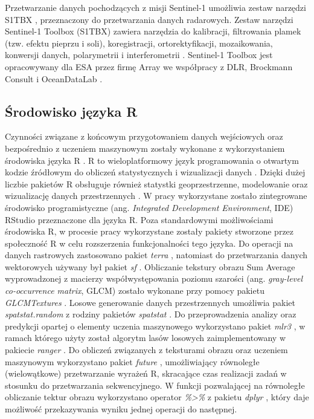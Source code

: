 \documentclass{amuthesis}
\begin{document}
Przetwarzanie danych pochodzących z misji Sentinel-1 umożliwia zestaw
narzędzi S1TBX \autocite{s1tbx}, przeznaczony do przetwarzania danych
radarowych. Zestaw narzędzi Sentinel-1 Toolbox (S1TBX) zawiera narzędzia
do kalibracji, filtrowania plamek (tzw. efektu pieprzu i soli),
koregistracji, ortorektyfikacji, mozaikowania, konwersji danych,
polarymetrii i interferometrii \autocite{sentinel-1-toolbox}. Sentinel-1
Toolbox jest opracowywany dla ESA przez firmę Array we współpracy z DLR,
Brockmann Consult i OceanDataLab \autocite{sentinel-1-toolbox}.

\hypertarget{ux15brodowisko-jux119zyka-r}{%
\subsection{Środowisko języka R}\label{ux15brodowisko-jux119zyka-r}}

Czynności związane z końcowym przygotowaniem danych wejściowych oraz
bezpośrednio z uczeniem maszynowym zostały wykonane z wykorzystaniem
środowiska języka R \autocite{R-base}. R to wieloplatformowy język
programowania o otwartym kodzie źródłowym do obliczeń statystycznych i
wizualizacji danych \autocite{lovelace_2019_geocomputation}. Dzięki
dużej liczbie pakietów R obsługuje również statystki geoprzestrzenne,
modelowanie oraz wizualizację danych przestrzennych
\autocite{lovelace_2019_geocomputation}. W pracy wykorzystane zostało
zintegrowane środowisko programistyczne (ang. \emph{Integrated
Development Environment}, IDE) RStudio
\autocite{rstudio_team_2020_rstudio} przeznaczone dla języka R. Poza
standardowymi możliwościami środowiska R, w procesie pracy wykorzystane
zostały pakiety stworzone przez społeczność R w celu rozszerzenia
funkcjonalności tego języka. Do operacji na danych rastrowych
zastosowano pakiet \emph{terra} \autocite{R-terra}, natomiast do
przetwarzania danych wektorowych używany był pakiet \emph{sf}
\autocite{R-sf}. Obliczanie tekstury obrazu Sum Average wyprowadzonej z
macierzy współwystępowania poziomu szarości (ang. \emph{gray-level
co-occurrence matrix}, GLCM) zostało wykonane przy pomocy pakietu
\emph{GLCMTextures} \autocite{R-GLCMTextures}. Losowe generowanie danych
przestrzennych umożliwia pakiet \emph{spatstat.random}
\autocite{R-spatstat.random} z rodziny pakietów \emph{spatstat}
\autocite{R-spatstat}. Do przeprowadzenia analizy oraz predykcji opartej
o elementy uczenia maszynowego wykorzystano pakiet \emph{mlr3}
\autocite{R-mlr3}, w ramach którego użyty został algorytm lasów losowych
zaimplementowany w pakiecie \emph{ranger} \autocite{R-ranger}. Do
obliczeń związanych z teksturami obrazu oraz uczeniem maszynowym
wykorzystano pakiet \emph{future} \autocite{R-future}, umożliwiający
równoległe (wielowątkowe) przetwarzanie wyrażeń R, skracające czas
realizacji zadań w stosunku do przetwarzania sekwencyjnego. W funkcji
pozwalającej na równoległe obliczanie tektur obrazu wykorzystano
operator \emph{\%\textgreater\%} z pakietu \emph{dplyr}
\autocite{R-dplyr}, który daje możliwość przekazywania wyniku jednej
operacji do następnej.
\end{document}

